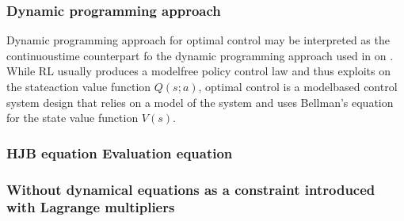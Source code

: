 \documentclass[letterpaper,10pt,english]{jupyterBook}
\begin{document}
\subsubsection{Dynamic programming approach}
\label{\detokenize{ch/control/optimal-control-full-state-general-ode:dynamic-programming-approach}}\label{\detokenize{ch/control/optimal-control-full-state-general-ode:control-optimal-full-state-fb-ode-dynamic-programming}}
\sphinxAtStartPar
Dynamic programming approach for optimal control may be interpreted as the continuous\sphinxhyphen{}time counterpart fo the dynamic programming approach used in  on {\hyperref[\detokenize{ch/rl/mdp:rl-mdp}]{}}. While RL usually produces a model\sphinxhyphen{}free policy \sphinxhyphen{} control law \sphinxhyphen{} and thus exploits {\hyperref[\detokenize{ch/rl/mdp:rl-mdp-dp-bellman-equations}]{}} on the state\sphinxhyphen{}action value function \(Q(s;a)\), optimal control is a model\sphinxhyphen{}based control system design that relies on a model of the system and uses Bellman’s equation for the state value function \(V(s)\).
\subsubsection*{HJB equation \sphinxhyphen{} Evaluation equation}
\subsubsection*{Without dynamical equations as a constraint introduced with Lagrange multipliers}
\end{document}
